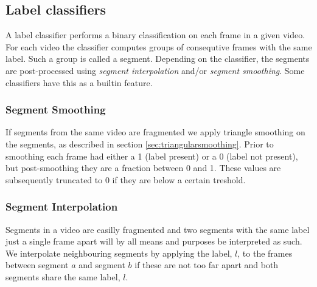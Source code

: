 \subsection{Label classifiers}
%
A label classifier performs a binary classification on each frame in a given video. For each video the classifier computes groups of consequtive frames with the same label. Such a group is called a segment. Depending on the classifier, the segments are post-processed using \textit{segment interpolation} and/or \textit{segment smoothing}. Some classifiers have this as a builtin feature.
%
\subsubsection{Segment Smoothing}\label{sec:labelsmooth}
%
If segments from the same video are fragmented we apply triangle smoothing on the segments, as described in section \ref{sec:triangularsmoothing}. Prior to smoothing each frame had either a 1 (label present) or a 0 (label not present), but post-smoothing they are a fraction between 0 and 1. These values are subsequently truncated to 0 if they are below a certain treshold.
%
\subsubsection{Segment Interpolation}\label{sec:labelmerge}
%
Segments in a video are easilly fragmented and two segments with the same label just a single frame apart will by all means and purposes be interpreted as such. We interpolate neighbouring segments by applying the label, $l$, to the frames between segment $a$ and segment $b$ if these are not too far apart and both segments share the same label, $l$.
%
